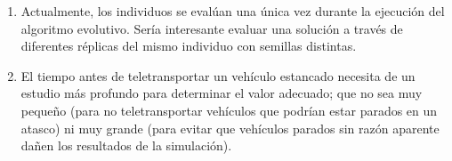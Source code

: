 \begin{enumerate}
    \item Actualmente, los individuos se evalúan una única vez durante la ejecución del algoritmo evolutivo. Sería interesante evaluar una solución a través de diferentes réplicas del mismo individuo con semillas distintas.
    
    \item El tiempo antes de teletransportar un vehículo estancado necesita de un estudio más profundo para determinar el valor adecuado; que no sea muy pequeño (para no teletransportar vehículos que podrían estar parados en un atasco) ni muy grande (para evitar que vehículos parados sin razón aparente dañen los resultados de la simulación).
\end{enumerate}
